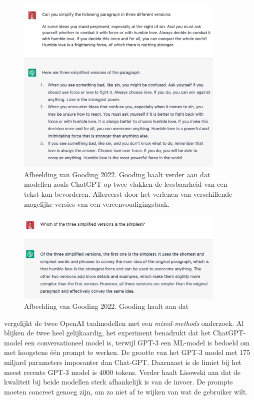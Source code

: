 \begin{figure}[H]
	\includegraphics[width=10cm]{img/chatgpt-example-different-versions-gooding.png}
	\caption{Afbeelding van Gooding 2022. Gooding haalt verder aan dat modellen zoals ChatGPT op twee vlakken de leesbaarheid van een tekst kan bevorderen. Allereerst door het verlenen van verschillende mogelijke versies van een vereenvoudigingstaak.}
\end{figure}

\begin{figure}[H]
	\includegraphics[width=10cm]{img/chatgpt-example-evaluation-gooding.png}
	\caption{Afbeelding van Gooding 2022. Gooding haalt aan dat %
	}
\end{figure}

\textcite{Lisowski2023} vergelijkt de twee OpenAI taalmodellen met een \textit{mixed-methods} onderzoek. Al blijken de twee heel gelijkaardig, het experiment benadrukt dat het ChatGPT-model een conversationeel model is, terwijl GPT-3 een ML-model is bedoeld om met hoogstens één prompt te werken. De grootte van het GPT-3 model met 175 miljard parameters imposanter dan Chat-GPT. Daarnaast is de limiet bij het meest recente GPT-3 model is 4000 tokens. Verder haalt Lisowski aan dat de kwaliteit bij beide modellen sterk afhankelijk is van de invoer. De prompts moeten concreet genoeg zijn, om zo niet af te wijken van wat de gebruiker wilt.

